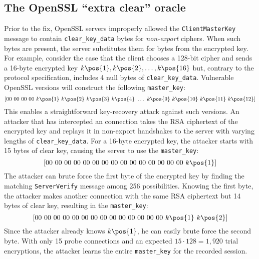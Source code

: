 \subsection{The OpenSSL ``extra clear'' oracle}


\label{sec:clear-key-vuln}

Prior to the fix, OpenSSL servers improperly allowed the \texttt{ClientMasterKey} message to contain
\texttt{clear\_key\_data} bytes for \emph{non-export} ciphers.  When such bytes are present,
the server substitutes them for bytes from the
encrypted key. For example, consider the case that the client chooses a 128-bit cipher and sends a 16-byte
encrypted key $k\pos{1}, k\pos{2}, \ldots, k\pos{16}$ but, contrary to the protocol specification, includes 4
null bytes of \texttt{clear\_key\_data}. Vulnerable OpenSSL versions will
construct the following \texttt{master\_key}:
\small
\[[00\ 00\ 00\ 00\ k\pos{1}\ k\pos{2}\ k\pos{3}\ k\pos{4}\ \dots\ k\pos{9}\ k\pos{10}\ k\pos{11}\ k\pos{12}]\]
\normalsize
This enables a straightforward key-recovery attack against such versions.
An attacker that has intercepted an \ssltwo connection takes the RSA
ciphertext of the encrypted key and replays it in non-export handshakes to
the server with varying lengths of \texttt{clear\_key\_data}. For a 16-byte
encrypted key, the attacker starts with 15 bytes of clear key, causing the server to use the \texttt{master\_key}:
\small
$$[00\ 00\ 00\ 00\ 00\ 00\ 00\ 00\ 00\ 00\ 00\ 00\ 00\ 00\ 00\ k\pos{1}]$$
\normalsize
The attacker can brute force the first byte of the encrypted key by
finding the matching \texttt{ServerVerify} message among 256
possibilities. Knowing the first byte, the attacker makes another
connection with the same RSA ciphertext but 14 bytes of clear key,
resulting in the \texttt{master\_key}:
\small
	$$[00\ 00\ 00\ 00\ 00\ 00\ 00\ 00\ 00\ 00\ 00\ 00\ 00\ 00\ k\pos{1}\ k\pos{2}]$$
\normalsize
Since the attacker already knows $k\pos{1}$, he can easily brute force
the second byte. With only 15 probe connections and an expected $15 \cdot 128 = 1,920$
trial encryptions, the attacker learns the entire \texttt{master\_key} for the
recorded session.


